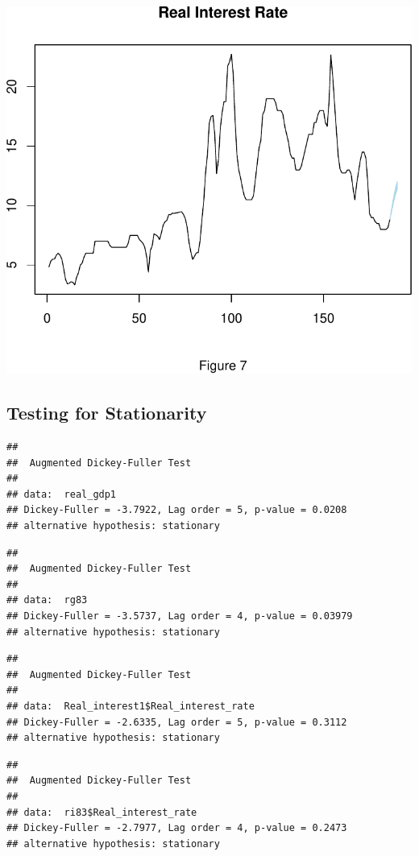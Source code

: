 \documentclass[11pt,preprint, authoryear]{elsarticle}
\numberwithin{equation}{section}
\numberwithin{figure}{section}
\numberwithin{table}{section}
\begin{document}
\includegraphics{TS_proj_files/figure-latex/unnamed-chunk-30-1.pdf}

\hypertarget{testing-for-stationarity}{%
\subsection{Testing for Stationarity}\label{testing-for-stationarity}}

\begin{verbatim}
## 
##  Augmented Dickey-Fuller Test
## 
## data:  real_gdp1
## Dickey-Fuller = -3.7922, Lag order = 5, p-value = 0.0208
## alternative hypothesis: stationary
\end{verbatim}

\begin{verbatim}
## 
##  Augmented Dickey-Fuller Test
## 
## data:  rg83
## Dickey-Fuller = -3.5737, Lag order = 4, p-value = 0.03979
## alternative hypothesis: stationary
\end{verbatim}

\begin{verbatim}
## 
##  Augmented Dickey-Fuller Test
## 
## data:  Real_interest1$Real_interest_rate
## Dickey-Fuller = -2.6335, Lag order = 5, p-value = 0.3112
## alternative hypothesis: stationary
\end{verbatim}

\begin{verbatim}
## 
##  Augmented Dickey-Fuller Test
## 
## data:  ri83$Real_interest_rate
## Dickey-Fuller = -2.7977, Lag order = 4, p-value = 0.2473
## alternative hypothesis: stationary
\end{verbatim}
\end{document}
